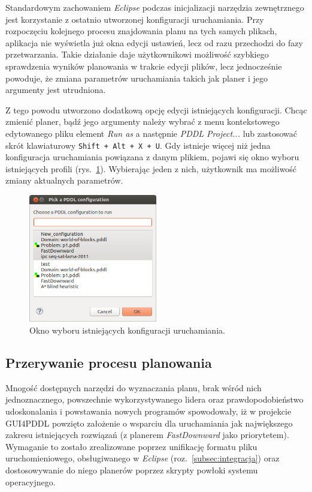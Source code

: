 Standardowym zachowaniem \emph{Eclipse} podczas inicjalizacji narzędzia zewnętrznego jest korzystanie z ostatnio utworzonej konfiguracji uruchamiania. Przy rozpoczęciu kolejnego procesu znajdowania planu na tych samych plikach, aplikacja nie wyświetla już okna edycji ustawień, lecz od razu przechodzi do fazy przetwarzania. Takie działanie daje użytkownikowi możliwość szybkiego sprawdzenia wyników planowania w trakcie edycji plików, lecz jednocześnie powoduje, że zmiana parametrów uruchamiania takich jak planer i jego argumenty jest utrudniona.

Z tego powodu utworzono dodatkową opcję edycji istniejących konfiguracji. Chcąc zmienić planer, bądź jego argumenty należy wybrać z menu kontekstowego edytowanego pliku element \emph{Run as} a następnie \emph{PDDL Project...} lub zastosować skrót klawiaturowy \texttt{Shift~+~Alt~+~X~+~U}. Gdy istnieje więcej niż jedna konfiguracja uruchamiania powiązana z danym plikiem, pojawi się okno wyboru istniejących profili (rys.~\ref{fig:run_configuration_choice}). Wybierając jeden z nich, użytkownik ma możliwość zmiany aktualnych parametrów.

\begin{figure}[h!]
    \centering
    \includegraphics[width=0.5\textwidth]{img/run_configuration_choice}
    \caption{Okno wyboru istniejących konfiguracji uruchamiania.}
    \label{fig:run_configuration_choice}
\end{figure}

\subsection{Przerywanie procesu planowania}
\label{subsec:przerywanie}
Mnogość dostępnych narzędzi do wyznaczania planu, brak wśród nich jednoznacznego, powszechnie wykorzystywanego lidera oraz prawdopodobieństwo udoskonalania i powstawania nowych programów spowodowały, iż w projekcie GUI4PDDL powzięto założenie o wsparciu dla uruchamiania jak największego zakresu istniejących rozwiązań (z planerem \emph{FastDownward} jako priorytetem). Wymaganie to zostało zrealizowane poprzez unifikację formatu pliku uruchomieniowego, obsługiwanego w \emph{Eclipse} (roz.~\ref{subsec:integracja}) oraz dostosowywanie do niego planerów poprzez skrypty powłoki systemu operacyjnego.

